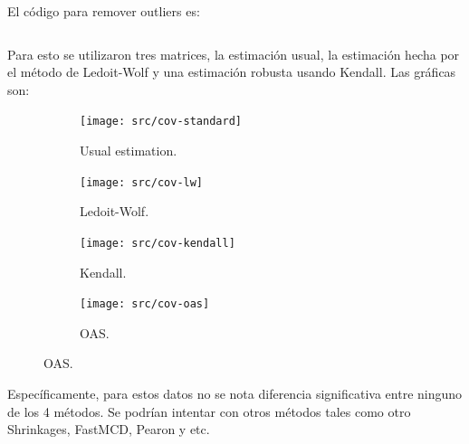 \documentclass[fleqn]{article}
\begin{document}
\begin{enumerate}
    El código para remover outliers es:
    \inputminted[firstline=156]{python}{src/exam.py}

    Para esto se utilizaron tres matrices, la estimación usual, la estimación
    hecha por el método de Ledoit-Wolf y una estimación robusta usando Kendall.
    Las gráficas son:
    \begin{figure}[H]
      \centering
      \begin{subfigure}[b]{0.45\textwidth}
        \texttt{[image: src/cov-standard]}
        \caption{Usual estimation.}
      \end{subfigure}
      \begin{subfigure}[b]{0.45\textwidth}
        \texttt{[image: src/cov-lw]}
        \caption{Ledoit-Wolf.}
      \end{subfigure}

      \begin{subfigure}[b]{0.45\textwidth}
        \texttt{[image: src/cov-kendall]}
        \caption{Kendall.}
      \end{subfigure}
      \begin{subfigure}[b]{0.45\textwidth}
        \texttt{[image: src/cov-oas]}
        \caption{OAS.}
      \end{subfigure}
    \end{figure}
    Específicamente, para estos datos no se nota diferencia significativa entre
    ninguno de los 4 métodos. Se podrían intentar con otros métodos tales como
    otro Shrinkages, FastMCD, Pearon y etc.
\end{enumerate}
\end{document}
